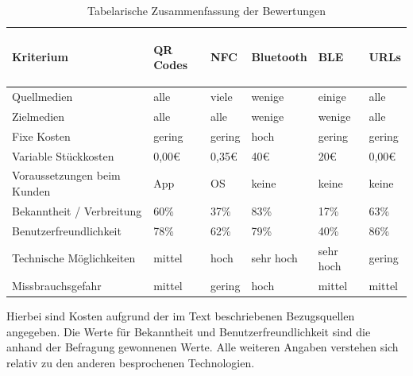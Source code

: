 \begin{table}[H]
\begin{center}
\begin{footnotesize}
\begin{tabular}{| l | C{1cm} | C{1cm} | C{1cm} | C{1cm} | C{1cm} |}  \hline                       
  \textbf{Kriterium} & 
	\begin{turn}{90}\textbf{QR Codes\vspace{0.1cm}}\end{turn} & 
	\begin{turn}{90}\textbf{NFC}\end{turn}  & 
	\begin{turn}{90}\textbf{Bluetooth}\end{turn} & 
	\begin{turn}{90}\textbf{BLE}\end{turn} & 
	\begin{turn}{90}\textbf{URLs}\end{turn}\\ \hline 
	Quellmedien					& alle   & viele   & wenige & einige   & alle \\  \hline  
	Zielmedien  				& alle   & alle    & wenige & wenige   & alle \\  \hline  
	Fixe Kosten 				& gering & gering  & hoch   & gering   & gering \\  \hline  
	Variable Stückkosten		& 0,00€  & 0,35€ & 40€  & 20€ & 0,00€ \\  \hline  
	Voraussetzungen beim Kunden & App    & OS      & keine  & keine    & keine \\  \hline  
	Bekanntheit / Verbreitung	& 60\%   & 37\%    & 83\%   & 17\%     & 63\% \\  \hline  
	Benutzerfreundlichkeit 		& 78\%   & 62\%    & 79\%   & 40\%     & 86\% \\  \hline  
	Technische Möglichkeiten   & mittel & hoch    & sehr hoch & sehr hoch & gering \\ \hline
	Missbrauchsgefahr 			& mittel & gering  & hoch   & mittel   & mittel \\  \hline  
			   
\end{tabular}
\end{footnotesize}
\caption{Tabelarische Zusammenfassung der Bewertungen}
\label{tab:zusammenfassung}
\end{center}
\end{table}

Hierbei sind Kosten aufgrund der im Text beschriebenen Bezugsquellen angegeben. Die Werte für Bekanntheit und Benutzerfreundlichkeit sind die anhand der Befragung gewonnenen Werte. Alle weiteren Angaben verstehen sich relativ zu den anderen besprochenen Technologien.

